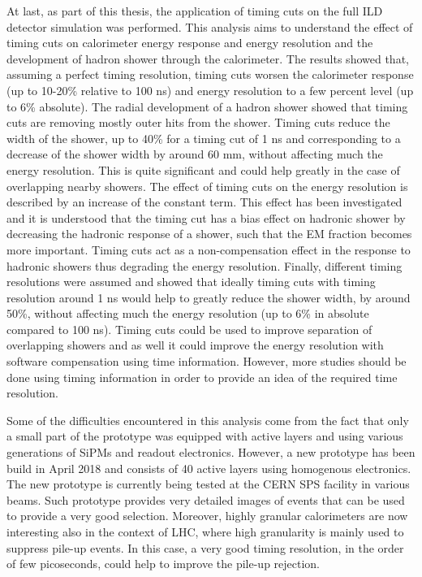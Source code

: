 At last, as part of this thesis, the application of timing cuts on the full ILD detector simulation was performed. This analysis aims to understand the effect of timing cuts on calorimeter energy response and energy resolution and the development of hadron shower through the calorimeter. The results showed that, assuming a perfect timing resolution, timing cuts worsen the calorimeter response (up to 10-20\% relative to 100 ns) and energy resolution to a few percent level (up to 6\% absolute). The radial development of a hadron shower showed that timing cuts are removing mostly outer hits from the shower. Timing cuts reduce the width of the shower, up to 40\% for a timing cut of 1 ns and corresponding to a decrease of the shower width by around 60 mm, without affecting much the energy resolution. This is quite significant and could help greatly in the case of overlapping nearby showers. The effect of timing cuts on the energy resolution is described by an increase of the constant term. This effect has been investigated and it is understood that the timing cut has a bias effect on hadronic shower by decreasing the hadronic response of a shower, such that the EM fraction becomes more important. Timing cuts act as a non-compensation effect in the response to hadronic showers thus degrading the energy resolution. Finally, different timing resolutions were assumed and showed that ideally timing cuts with timing resolution around 1 ns would help to greatly reduce the shower width, by around 50\%, without affecting much the energy resolution (up to 6\% in absolute compared to 100 ns). Timing cuts could be used to improve separation of overlapping showers and as well it could improve the energy resolution with software compensation using time information. However, more studies should be done using timing information in order to provide an idea of the required time resolution.

Some of the difficulties encountered in this analysis come from the fact that only a small part of the prototype was equipped with active layers and using various generations of SiPMs and readout electronics. However, a new prototype has been build in April 2018 and consists of 40 active layers using homogenous electronics. The new prototype is currently being tested at the CERN SPS facility in various beams. Such prototype provides very detailed images of events that can be used to provide a very good selection. Moreover, highly granular calorimeters are now interesting also in the context of LHC, where high granularity is mainly used to suppress pile-up events. In this case, a very good timing resolution, in the order of few picoseconds, could help to improve the pile-up rejection.
